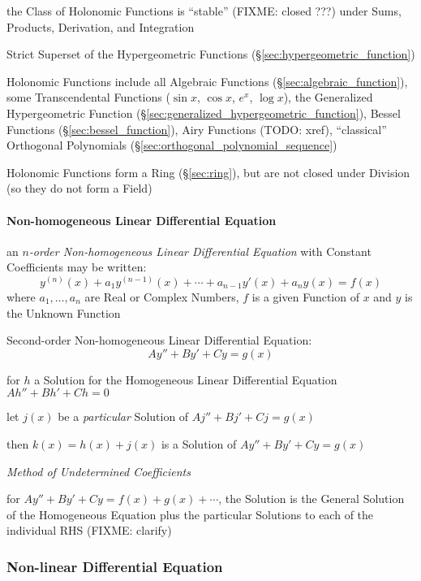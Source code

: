 the Class of Holonomic Functions is ``stable'' (FIXME: closed ???) under Sums,
Products, Derivation, and Integration

Strict Superset of the Hypergeometric Functions
(\S\ref{sec:hypergeometric_function})

Holonomic Functions include all Algebraic Functions
(\S\ref{sec:algebraic_function}), some Transcendental Functions ($\sin x$,
$\cos x$, $e^x$, $\log x$), the Generalized Hypergeometric Function
(\S\ref{sec:generalized_hypergeometric_function}), Bessel Functions
(\S\ref{sec:bessel_function}), Airy Functions (TODO: xref), ``classical''
Orthogonal Polynomials (\S\ref{sec:orthogonal_polynomial_sequence})

Holonomic Functions form a Ring (\S\ref{sec:ring}), but are not closed under
Division (so they do not form a Field)



\paragraph{Non-homogeneous Linear Differential Equation}
\label{sec:nonhomogeneous_linear_differential}\hfill

an \emph{$n$-order Non-homogeneous Linear Differential Equation} with Constant
Coefficients may be written:
\[
  y^{(n)}(x) + a_1y^{(n-1)}(x) + \cdots + a_{n-1}y'(x) + a_ny(x) = f(x)
\]
where $a_1,\ldots,a_n$ are Real or Complex Numbers, $f$ is a given Function of
$x$ and $y$ is the Unknown Function

Second-order Non-homogeneous Linear Differential Equation:
\[
  A y'' + B y' + C y = g(x)
\]

for $h$ a Solution for the Homogeneous Linear Differential Equation $Ah'' + Bh'
+ Ch = 0$

let $j(x)$ be a \emph{particular} Solution of $Aj'' + Bj' + Cj = g(x)$

then $k(x) = h(x) + j(x)$ is a Solution of $A y'' + B y' + C y = g(x)$

\emph{Method of Undetermined Coefficients}

for $A y'' + B y' + C y = f(x) + g(x) + \cdots$, the Solution is the General
Solution of the Homogeneous Equation plus the particular Solutions to each of
the individual RHS (FIXME: clarify)



\subsubsection{Non-linear Differential Equation}
\label{sec:nonlinear_differential_equation}

